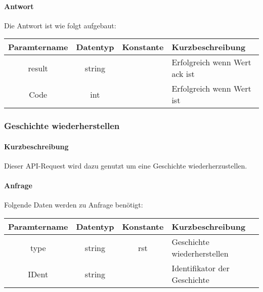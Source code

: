 \paragraph{Antwort}Die Antwort ist wie folgt aufgebaut:
\begin{table}[H]
	\begin{tabular}{|c|c|c|p{6.5cm}|}
		\hline
		\textbf{Paramtername} & \textbf{Datentyp} & \textbf{Konstante} & \textbf{Kurzbeschreibung}                                                                                               \\ \hline
		result              & string           &                 & Erfolgreich wenn Wert {\glqq ack\grqq} ist \\ \hline
		Code                & int              &                 & Erfolgreich wenn Wert {\glqq 0\grqq} ist \\ \hline
	\end{tabular}
\end{table}
\subsubsection{Geschichte wiederherstellen}
\paragraph{Kurzbeschreibung}Dieser API-Request wird dazu genutzt um eine Geschichte wiederherzustellen.
\paragraph{Anfrage}Folgende Daten werden zu Anfrage benötigt:
\begin{table}[H]
	\begin{tabular}{|c|c|c|p{6.5cm}|}
		\hline
		\textbf{Paramtername} & \textbf{Datentyp} & \textbf{Konstante} & \textbf{Kurzbeschreibung}                                                                                               \\ \hline
		type                & string            & rst                & Geschichte wiederherstellen \\ \hline
		IDent               & string            &                    & Identifikator der Geschichte \\ \hline
	\end{tabular}
\end{table}
